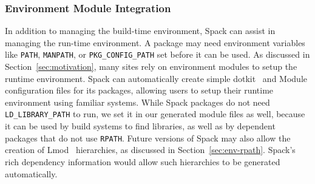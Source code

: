 \subsubsection{Environment Module Integration}
\label{sec:envmodule}
In addition to managing the build-time environment, Spack can assist in managing
the run-time environment.  A package may need environment variables like {\tt PATH},
{\tt MANPATH}, or {\tt PKG\_CONFIG\_PATH} set before it can be used.
As discussed in Section~\ref{sec:motivation}, many sites rely on environment
modules to setup the runtime environment.  Spack can automatically create simple
dotkit~\cite{dotkit} and Module configuration files for its packages, allowing
users to setup their runtime environment using familiar systems.  While Spack
packages do not need {\tt LD\_LIBRARY\_PATH} to run, we set it in our generated module
files as well, because it can be used by build systems to find libraries, as well
as by dependent packages that do not use {\tt RPATH}.
%
Future versions of Spack may also allow the creation of Lmod~\cite{mclay:lmod}
hierarchies, as discussed in Section~\ref{sec:env-rpath}. Spack's rich
dependency information would allow such hierarchies to be generated automatically.

